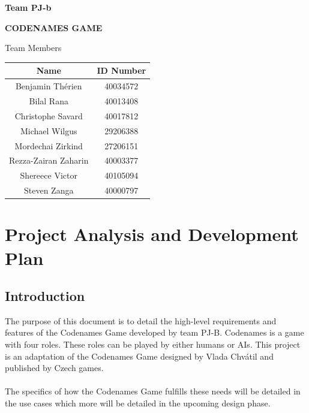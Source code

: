 \documentclass[10pt, a4paper]{article}
\begin{document}
	
\hrulefill
\begin{flushright}
\textbf{Team PJ-b}
\end{flushright}
\hrulefill

\vspace*{0.5in}
\centerline{\bf\Large CODENAMES GAME}

\vspace*{1.5in}


\begin{table}[htbp] 
\begin{center} 
	\begin{center} 
		Team Members\\
		
	\end{center} 
	\begin{tabular}{| c | c |} 
		\hline 
		Name & ID Number \\ 
		\hline\hline 
		Benjamin Th\'erien & 40034572\\ 
		Bilal Rana & 40013408 \\
		Christophe Savard & 40017812\\
		Michael Wilgus & 29206388 \\ 
		Mordechai Zirkind & 27206151\\
		Rezza-Zairan Zaharin & 40003377 \\
		Shereece Victor & 40105094\\ 
		Steven Zanga & 40000797\\ 
		 
		\hline 
	\end{tabular} 
\end{center} 
\end{table} 


\newpage 
\tableofcontents
\newpage 

\section{Project Analysis and Development Plan}

	\subsection{Introduction}
	
	 The purpose of this document is to detail the high-level requirements and features of the Codenames Game developed by team PJ-B. Codenames is a game with four roles. These roles can be played by either humans or AIs. This project is an adaptation of the Codenames Game designed by Vlada Chv\'atil and published by Czech games.\\
	 \\
	 The specifics of how the Codenames Game fulfills these needs will be detailed in the use cases which more will be detailed in the upcoming design phase.\\
	
\end{document}
